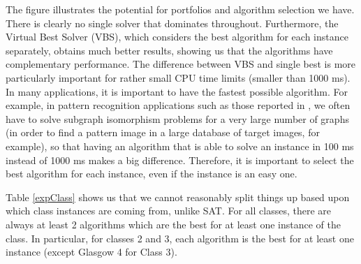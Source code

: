 \documentclass{llncs}
\begin{document}
The figure illustrates the potential for portfolios and algorithm selection we have. There is clearly no single solver that dominates throughout. 
Furthermore, the Virtual Best Solver (VBS), which considers the best algorithm for each instance separately, obtains much better results, showing us that the algorithms have complementary performance. The difference between VBS and single best is more particularly important for rather small CPU time limits (smaller than 1000 ms). In many applications, it is important to have the fastest possible algorithm. For example, in pattern recognition applications such as those reported in \cite{pr15,cviu11}, we often have to solve subgraph isomorphism problems for a very large number of graphs (in order to find a pattern image in a large database of target images, for example), so that having an algorithm that is able to solve an instance in 100 ms instead of 1000 ms makes a big difference. Therefore, it is important to select the best algorithm for each instance, even if the instance is an easy one.

Table \ref{expClass} shows us that we cannot reasonably split things up based upon which class instances are coming from, unlike SAT. For all classes, there are always at least 2 algorithms which are the best for at least one instance of the class. In particular, for classes 2 and 3, each algorithm is the best for at least one instance (except Glasgow 4 for Class 3).
\end{document}
